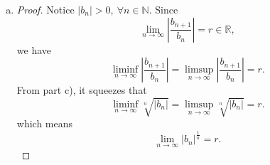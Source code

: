 \documentclass{report}
\begin{document}
\begin{Exercise}
\begin{enumerate}[a)]
\begin{proof}
\vspace{2ex}

Combining all above discussions and replacing the notation $n$ with $k$, we conclude $$\liminf_{k\to\infty}\frac{a_{k+1}}{a_k} \leq  \liminf_{k\to\infty}\sqrt[k]{a_k} \leq
\limsup_{k\to\infty}\sqrt[k]{a_k} \leq
\limsup_{k\to\infty}\frac{a_{k+1}}{a_k}.$$
\end{proof}

\item
\begin{proof}
Notice $|b_n| > 0,\ \forall n\in\mathbb{N}$. Since $$\lim_{n\to\infty}\left|\frac{b_{n+1}}{b_n}\right| = r \in \mathbb{R},$$ we have $$\liminf_{n\to\infty}\left|\frac{b_{n+1}}{b_n}\right| = \limsup_{n\to\infty}\left|\frac{b_{n+1}}{b_n}\right| = r.$$
From part c), it squeezes that $$\liminf_{n\to\infty}\sqrt[n]{|b_n|} = \limsup_{n\to\infty}\sqrt[n]{|b_n|} = r.$$
which means $$\lim_{n\to\infty}\left|b_n\right|^{\frac{1}{n}} = r.$$
\end{proof}
\end{enumerate}
\end{Exercise}
\end{document}
